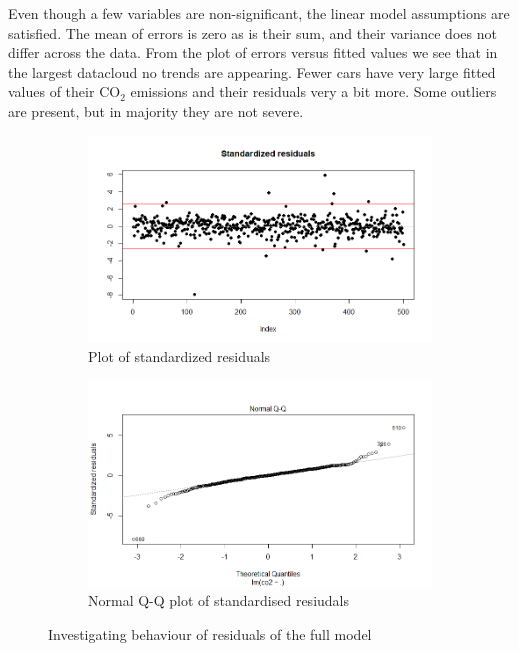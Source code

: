 \documentclass[12pt]{article}
\begin{document}
Even though a few variables are non-significant, the linear model assumptions are satisfied. The mean of errors is zero as is their sum,
and their variance does not differ across the data. From the plot of errors versus fitted values we see that in the largest datacloud no trends
are appearing. Fewer cars have very large fitted values of their $\text{CO}_2$ emissions and their residuals very a bit more.
Some outliers are present, but in majority they are not severe.

\begin{figure}[h]
  \begin{subfigure}[b]{0.5\linewidth}
      \centering
      \includegraphics[width=\textwidth]{project3/cars.full.res.png}
      \caption{Plot of standardized residuals}
      \label{fig:cars.full.res}
  \end{subfigure}%
  \begin{subfigure}[b]{0.5\linewidth}
      \centering
   \includegraphics[width=\textwidth]{project3/QQ_cars.full.res.png}
   \caption{Normal Q-Q plot of standardised resiudals}\label{fig:QQ_cars.full}
  \end{subfigure}%
 \caption{Investigating behaviour of residuals of the full model}
\end{figure}
\end{document}
